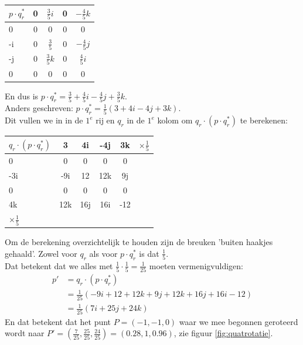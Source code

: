 \begin{center}
	\begin{tabular}{ | l || c | c |c |c |}
		\hline
		$ p\cdot q^*_r $  & 0 & $  \frac{3}{5}i  $  & 0 & $ - \frac{4}{5}k $  \\ \hline \hline
		0                 & 0 & 0                          & 0    & 0  \\ \hline
		-i                & 0 &  $  \frac{3}{5}  $  & 0   & $ - \frac{4}{5}j $\\ \hline
		-j                & 0 &  $  \frac{3}{5}k $  & 0     & $  \frac{4}{5}i $\\ \hline
		0                 & 0 & 0                          & 0   & 0 \\
		\hline 
	\end{tabular}
\end{center}

En dus is $ p\cdot q^*_r = \frac{3}{5}  + \frac{4}{5}i - \frac{4}{5}j  + \frac{3}{5}k $. \\
Anders geschreven:  $ p\cdot q^*_r = \frac{1}{5}  (3 + 4i - 4j  + 3k) $. \\
Dit vullen we  in in de $ 1^e $ rij en $ q_r $ in de $ 1^e  $ kolom om $ q_r\cdot (p\cdot q^*_r) $ te berekenen:\\
\begin{center}
	\begin{tabular}{ | l || c | c |c |c |l}
		\hline
		$ q_r\cdot (p\cdot q^*_r) $  & 3 & 4i   & -4j & 3k &  $ \times  \frac{1}{5} $\\ \hline \hline
		0                         & 0    & 0    & 0       & 0 & \\ \hline
		-3i                      & -9i   & 12  & 12k    & 9j & \\ \hline
		0                         & 0    &  0   & 0       & 0&\\ \hline
		4k                       & 12k & 16j  & 16i   & -12 & \\ 
		\hline 
		$ \times  \frac{1}{5} $
	\end{tabular}
\end{center}
Om de berekening overzichtelijk te houden zijn de breuken 'buiten haakjes gehaald'. Zowel voor $ q_r $ als voor $ p\cdot q^*_r $ is dat $  \frac{1}{5} $. \\
Dat betekent dat we alles met $  \frac{1}{5} \cdot  \frac{1}{5}  =  \frac{1}{25} $ moeten vermenigvuldigen: 
\begin{align*}
    p' &=  q_r\cdot (p\cdot q^*_r)  \\
       &=  \frac{1}{25}(-9i + 12 +12k + 9j + 12k + 16j + 16i -  12)  \\
       & = \frac{1}{25} (7i + 25j +  24k  )
\end{align*}
En dat betekent dat het punt $ P=(-1,-1,0)  $ waar we mee begonnen  geroteerd wordt naar $ P'=  (\frac{7}{25}, \frac{25}{25}, \frac{24}{25}) =(0.28,1,0.96)  $, zie  figuur \ref{fig:quatrotatie}.

